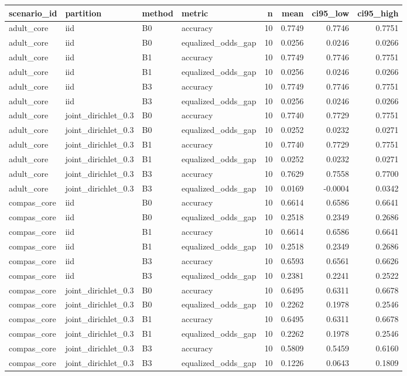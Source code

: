 \begin{tabular}{llllrrrr}
\toprule
scenario\_id & partition & method & metric & n & mean & ci95\_low & ci95\_high \\
\midrule
adult\_core & iid & B0 & accuracy & 10 & 0.7749 & 0.7746 & 0.7751 \\
adult\_core & iid & B0 & equalized\_odds\_gap & 10 & 0.0256 & 0.0246 & 0.0266 \\
adult\_core & iid & B1 & accuracy & 10 & 0.7749 & 0.7746 & 0.7751 \\
adult\_core & iid & B1 & equalized\_odds\_gap & 10 & 0.0256 & 0.0246 & 0.0266 \\
adult\_core & iid & B3 & accuracy & 10 & 0.7749 & 0.7746 & 0.7751 \\
adult\_core & iid & B3 & equalized\_odds\_gap & 10 & 0.0256 & 0.0246 & 0.0266 \\
adult\_core & joint\_dirichlet\_0.3 & B0 & accuracy & 10 & 0.7740 & 0.7729 & 0.7751 \\
adult\_core & joint\_dirichlet\_0.3 & B0 & equalized\_odds\_gap & 10 & 0.0252 & 0.0232 & 0.0271 \\
adult\_core & joint\_dirichlet\_0.3 & B1 & accuracy & 10 & 0.7740 & 0.7729 & 0.7751 \\
adult\_core & joint\_dirichlet\_0.3 & B1 & equalized\_odds\_gap & 10 & 0.0252 & 0.0232 & 0.0271 \\
adult\_core & joint\_dirichlet\_0.3 & B3 & accuracy & 10 & 0.7629 & 0.7558 & 0.7700 \\
adult\_core & joint\_dirichlet\_0.3 & B3 & equalized\_odds\_gap & 10 & 0.0169 & -0.0004 & 0.0342 \\
compas\_core & iid & B0 & accuracy & 10 & 0.6614 & 0.6586 & 0.6641 \\
compas\_core & iid & B0 & equalized\_odds\_gap & 10 & 0.2518 & 0.2349 & 0.2686 \\
compas\_core & iid & B1 & accuracy & 10 & 0.6614 & 0.6586 & 0.6641 \\
compas\_core & iid & B1 & equalized\_odds\_gap & 10 & 0.2518 & 0.2349 & 0.2686 \\
compas\_core & iid & B3 & accuracy & 10 & 0.6593 & 0.6561 & 0.6626 \\
compas\_core & iid & B3 & equalized\_odds\_gap & 10 & 0.2381 & 0.2241 & 0.2522 \\
compas\_core & joint\_dirichlet\_0.3 & B0 & accuracy & 10 & 0.6495 & 0.6311 & 0.6678 \\
compas\_core & joint\_dirichlet\_0.3 & B0 & equalized\_odds\_gap & 10 & 0.2262 & 0.1978 & 0.2546 \\
compas\_core & joint\_dirichlet\_0.3 & B1 & accuracy & 10 & 0.6495 & 0.6311 & 0.6678 \\
compas\_core & joint\_dirichlet\_0.3 & B1 & equalized\_odds\_gap & 10 & 0.2262 & 0.1978 & 0.2546 \\
compas\_core & joint\_dirichlet\_0.3 & B3 & accuracy & 10 & 0.5809 & 0.5459 & 0.6160 \\
compas\_core & joint\_dirichlet\_0.3 & B3 & equalized\_odds\_gap & 10 & 0.1226 & 0.0643 & 0.1809 \\
\bottomrule
\end{tabular}

